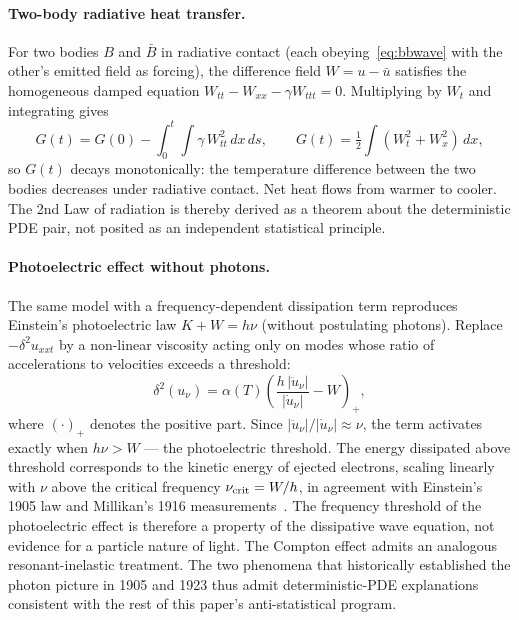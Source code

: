 \documentclass[11pt]{article}
\begin{document}
\paragraph{Two-body radiative heat transfer.}
For two bodies $B$ and $\bar B$ in radiative contact (each obeying~\eqref{eq:bbwave} with the other's emitted field as forcing), the difference field $W = u - \bar u$ satisfies the homogeneous damped equation $W_{tt} - W_{xx} - \gamma W_{ttt} = 0$. Multiplying by $W_t$ and integrating gives
\begin{equation}
G(t) = G(0) - \int_0^t \int \gamma\, W_{tt}^2\,dx\,ds, \qquad G(t) = \tfrac{1}{2}\int (W_t^2 + W_x^2)\,dx,
\end{equation}
so $G(t)$ decays monotonically: the temperature difference between the two bodies decreases under radiative contact. Net heat flows from warmer to cooler. The 2nd Law of radiation is thereby derived as a theorem about the deterministic PDE pair, not posited as an independent statistical principle.

\paragraph{Photoelectric effect without photons.}
The same model with a frequency-dependent dissipation term reproduces Einstein's photoelectric law $K + W = h\nu$ (without postulating photons). Replace $-\delta^2 u_{xxt}$ by a non-linear viscosity acting only on modes whose ratio of accelerations to velocities exceeds a threshold:
\begin{equation}
\delta^2(u_\nu) = \alpha(T)\left(\frac{h\,|\ddot u_\nu|}{|\dot u_\nu|} - W\right)_{\!+},
\end{equation}
where $(\cdot)_+$ denotes the positive part. Since $|\ddot u_\nu|/|\dot u_\nu| \approx \nu$, the term activates exactly when $h\nu > W$ --- the photoelectric threshold. The energy dissipated above threshold corresponds to the kinetic energy of ejected electrons, scaling linearly with $\nu$ above the critical frequency $\nu_{\rm crit} = W/h$, in agreement with Einstein's 1905 law and Millikan's 1916 measurements~\cite{Johnson2010BB}. The frequency threshold of the photoelectric effect is therefore a property of the dissipative wave equation, not evidence for a particle nature of light. The Compton effect admits an analogous resonant-inelastic treatment. The two phenomena that historically established the photon picture in 1905 and 1923 thus admit deterministic-PDE explanations consistent with the rest of this paper's anti-statistical program.
\end{document}
